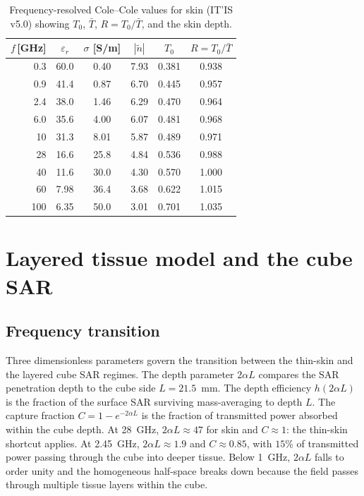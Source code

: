 \documentclass[journal,twocolumn,10pt]{IEEEtran}
\theoremstyle{plain}
\theoremstyle{remark}
\newcommand{\Tbar}{\bar{T}}
\newcommand{\ntilde}{\tilde{n}}
\begin{document}
\begin{table}[!t]
\centering
\caption{Frequency-resolved Cole--Cole values for skin (IT'IS v5.0)
showing $T_0$, $\Tbar$, $R = T_0/\Tbar$, and the skin depth.}
\label{tab:itis-fvs}
\begin{tabular}{rccccc}
\toprule
$f$\,[GHz] & $\varepsilon_r$ & $\sigma$ [S/m] & $|\ntilde|$
  & $T_0$ & $R = T_0/\Tbar$ \\
\midrule
0.3  & 60.0 & 0.40 & 7.93 & 0.381 & 0.938 \\
0.9  & 41.4 & 0.87 & 6.70 & 0.445 & 0.957 \\
2.4  & 38.0 & 1.46 & 6.29 & 0.470 & 0.964 \\
6.0  & 35.6 & 4.00 & 6.07 & 0.481 & 0.968 \\
10   & 31.3 & 8.01 & 5.87 & 0.489 & 0.971 \\
28   & 16.6 & 25.8 & 4.84 & 0.536 & 0.988 \\
40   & 11.6 & 30.0 & 4.30 & 0.570 & 1.000 \\
60   &  7.98 & 36.4 & 3.68 & 0.622 & 1.015 \\
100  &  6.35 & 50.0 & 3.01 & 0.701 & 1.035 \\
\bottomrule
\end{tabular}
\end{table}


\section{Layered tissue model and the cube SAR}\label{si:layered}

\subsection{Frequency transition}
Three dimensionless parameters govern the transition between the
thin-skin and the layered cube SAR regimes. The depth parameter
$2\alpha L$ compares the SAR penetration depth to the cube side
$L = 21.5$~mm. The depth efficiency $h(2\alpha L)$ is the fraction
of the surface SAR surviving mass-averaging to depth $L$. The
capture fraction $C = 1 - e^{-2\alpha L}$ is the fraction of
transmitted power absorbed within the cube depth.
At 28~GHz, $2\alpha L \approx 47$ for skin and $C \approx 1$: the
thin-skin shortcut applies. At 2.45~GHz, $2\alpha L \approx 1.9$
and $C \approx 0.85$, with $15\%$ of transmitted power passing
through the cube into deeper tissue. Below 1~GHz, $2\alpha L$
falls to order unity and the homogeneous half-space breaks down
because the field passes through multiple tissue layers within the cube.
\end{document}

